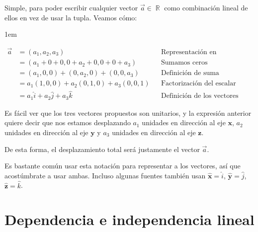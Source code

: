 \documentclass[12pt, fleqn]{report}                             %
\newenvironment{SmallIndentation}[1][0.75em]                    %
    {\begin{adjustwidth}{#1}{}\begin{footnotesize}}                 %
    {\end{footnotesize}\end{adjustwidth}}                           %
\DeclareMathOperator \Reals        {\mathbb{R}}                 %
\newcommand{\uVec}[1]{\boldsymbol{\hat{\textbf{#1}}}}           %
\begin{document}
                    Simple, para poder escribir cualquier vector $\vec{a} \in \Reals$ como combinación
                    lineal de ellos en vez de usar la tupla.
                    Veamos cómo:
                    \begin{SmallIndentation}[1em]
                        \begin{align*}
                            \vec{a}
                                &= (a_1, a_2, a_3)                               &&\mbox{Representación en coordenadas}        \\
                                &= (a_1 + 0 + 0, 0 + a_2 + 0, 0 + 0 + a_3)       &&\mbox{Sumamos ceros convenientemente}       \\
                                &= (a_1, 0, 0) + (0, a_2, 0) + (0, 0, a_3)       &&\mbox{Definición de suma}                   \\
                                &= a_1(1, 0, 0) + a_2(0, 1, 0) + a_3(0, 0, 1)    &&\mbox{Factorización del escalar}            \\
                                &= a_1\hat{i} + a_2\hat{j} + a_3\hat{k}			 &&\mbox{Definición de los vectores canónicos}
                        \end{align*}
                    \end{SmallIndentation}
                
                    Es fácil ver que los tres vectores propuestos son unitarios, y la expresión anterior
                    quiere decir que nos estamos desplazando $a_1$ unidades en dirección al eje $\mathbf{x}$,
                    $a_2$ unidades en dirección al eje $\mathbf{y}$ y $a_3$ unidades en dirección al eje
                    $\mathbf{z}$.

                    De esta forma, el desplazamiento total será justamente el vector $\vec{a}$.
                    
                    Es bastante común usar esta notación para representar a los vectores, así que acostúmbrate a usar ambas. Incluso algunas fuentes también usan $\uVec{x}=\hat{i}$, $\uVec{y}=\hat{j}$, $\uVec{z}=\hat{k}$.
                    



        \clearpage
        \section{Dependencia e independencia lineal}
            
\end{document}
